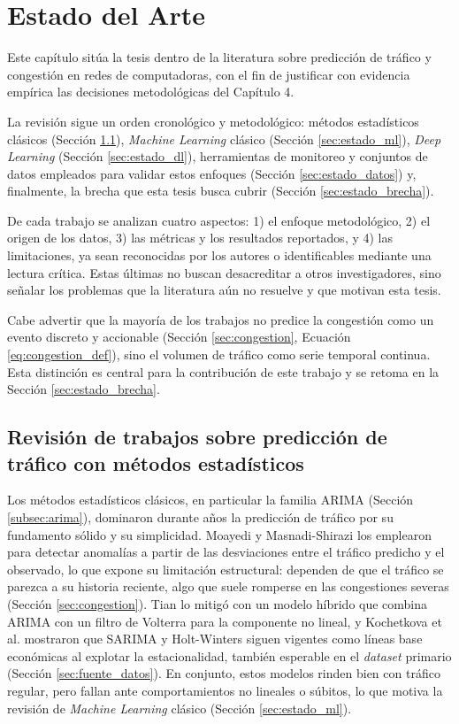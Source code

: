 \documentclass[12pt]{report}
\begin{document}
\chapter{Estado del Arte}
\label{cap:estado_arte}

Este capítulo sitúa la tesis dentro de la literatura sobre predicción de tráfico y congestión en redes de computadoras, con el fin de justificar con evidencia empírica las decisiones metodológicas del Capítulo 4.

La revisión sigue un orden cronológico y metodológico: métodos estadísticos clásicos (Sección \ref{sec:estado_estadistica}), \textit{Machine Learning} clásico (Sección \ref{sec:estado_ml}), \textit{Deep Learning} (Sección \ref{sec:estado_dl}), herramientas de monitoreo y conjuntos de datos empleados para validar estos enfoques (Sección \ref{sec:estado_datos}) y, finalmente, la brecha que esta tesis busca cubrir (Sección \ref{sec:estado_brecha}).

De cada trabajo se analizan cuatro aspectos: 1) el enfoque metodológico, 2) el origen de los datos, 3) las métricas y los resultados reportados, y 4) las limitaciones, ya sean reconocidas por los autores o identificables mediante una lectura crítica. Estas últimas no buscan desacreditar a otros investigadores, sino señalar los problemas que la literatura aún no resuelve y que motivan esta tesis.

Cabe advertir que la mayoría de los trabajos no predice la congestión como un evento discreto y accionable (Sección \ref{sec:congestion}, Ecuación \ref{eq:congestion_def}), sino el volumen de tráfico como serie temporal continua. Esta distinción es central para la contribución de este trabajo y se retoma en la Sección \ref{sec:estado_brecha}.

\section{Revisión de trabajos sobre predicción de tráfico con métodos estadísticos}
\label{sec:estado_estadistica}

Los métodos estadísticos clásicos, en particular la familia ARIMA (Sección \ref{subsec:arima}), dominaron durante años la predicción de tráfico por su fundamento sólido y su simplicidad. Moayedi y Masnadi-Shirazi \cite{moayedi2008} los emplearon para detectar anomalías a partir de las desviaciones entre el tráfico predicho y el observado, lo que expone su limitación estructural: dependen de que el tráfico se parezca a su historia reciente, algo que suele romperse en las congestiones severas (Sección \ref{sec:congestion}). Tian \cite{tian2021} lo mitigó con un modelo híbrido que combina ARIMA con un filtro de Volterra para la componente no lineal, y Kochetkova et al. \cite{kochetkova2023} mostraron que SARIMA y Holt-Winters siguen vigentes como líneas base económicas al explotar la estacionalidad, también esperable en el \textit{dataset} primario (Sección \ref{sec:fuente_datos}). En conjunto, estos modelos rinden bien con tráfico regular, pero fallan ante comportamientos no lineales o súbitos, lo que motiva la revisión de \textit{Machine Learning} clásico (Sección \ref{sec:estado_ml}).
\end{document}
